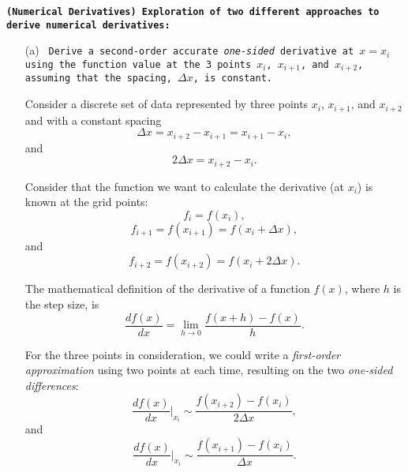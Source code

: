 \documentclass[11pt]{article}
\author{\color{purple}{\bf Marina von Steinkirch}}
\title{\color{red}{\bf PHYS 688: Numerical Methods for AstroPhysics \\Homework \#1: Integration \&  Differentiation} }
\newcounter{question}[section]
\newcommand{\question}[2] {\vspace{.25in} \fbox{#1} #2 \vspace{.10in}}
\begin{document}
\maketitle



{\color{MidnightBlue}
\question{Q.1}{\texttt{{\bf(Numerical Derivatives)} {\bf Exploration of two different approaches to derive numerical derivatives:	
}}}}

\quad

\begin{enumerate}

\item[(a)] {\color{MidnightBlue} \texttt{ Derive a second-order accurate {\it one-sided} derivative at $x=x_i$ using	the function value at the 3 points $x_i$, $x_{i+1}$, and $x_{i+2}$, assuming that the spacing, $\Delta x$, is constant.}}

\quad

Consider a discrete set of data represented by three points $x_i$, $x_{i+1}$, and $x_{i+2}$ and with a constant spacing 
$$\Delta x = x_{i+2}-x_{i+1}=x_{i+1}-x_i,$$
and
$$2\Delta x = x_{i+2}-x_{i}.$$

\quad

Consider that the function we want to calculate the derivative (at $x_i$) is known at the grid points:
$$f_i=f(x_i),$$   
$$f_{i+1}=f(x_{i+1})=f(x_i + \Delta x),$$
and 
$$f_{i+2}=f(x_{i+2})= f(x_i + 2 \Delta x).$$ 

\quad

The mathematical definition of the derivative of a function $f(x)$, where $h$ is the step size, is
\begin{equation}
\frac{df(x)}{dx} = \lim_{h \rightarrow 0} \frac{f(x+h)-f(x)}{h }.
\label{f'}
\end{equation}

\quad

For the three points in consideration, we could write a {\it first-order approximation} using two points at each time, resulting on the two {\it one-sided differences}:
$$\frac{df(x)}{dx}\Bigg|_{x_{i}} \sim \frac{f(x_{i+2}) - f(x_{i})}{2 \Delta x},$$
and
$$\frac{df(x)}{dx}\Bigg|_{x_{i}} \sim \frac{f(x_{i+1}) - f(x_{i})}{\Delta x}.$$

\quad


\end{enumerate}
\end{document}
